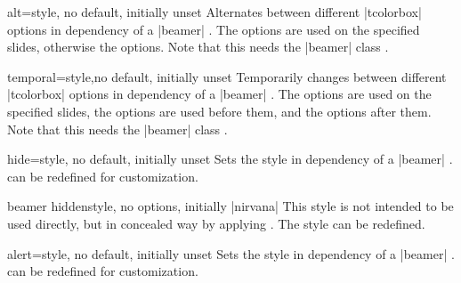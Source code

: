 \begin{docTcbKey}[][doc new={2025-05-28}]{alt}{=}{style, no default, initially unset}
Alternates between different |tcolorbox| options in dependency of a |beamer| .
The  options are used on the specified slides, otherwise the  options.
Note that this needs the |beamer| class \cite{tantau:beamer}.
\end{docTcbKey}

\begin{docTcbKey}[][doc new={2025-05-28}]{temporal}{=}{style,\linebreak no default, initially unset}
Temporarily changes between different |tcolorbox| options in dependency of a |beamer| .
The  options are used on the specified slides,
the  options are used before them, and
the  options after them.
Note that this needs the |beamer| class \cite{tantau:beamer}.
\end{docTcbKey}

\clearpage

\begin{docTcbKey}[][doc new={2019-03-01}]{hide}{=}{style, no default, initially unset}
Sets the  style in dependency of
a |beamer| .
 can be redefined for customization.
\end{docTcbKey}

\begin{docTcbKey}[][doc new={2019-03-01}]{beamer hidden}{}{style, no options, initially |nirvana|}
This style is not intended to be used directly, but in concealed way by applying
. The style can be redefined.
\begin{dispListing}
\end{dispListing}
\end{docTcbKey}

\begin{docTcbKey}[][doc new={2019-03-01}]{alert}{=}{style, no default, initially unset}
Sets the  style in dependency of
a |beamer| .
 can be redefined for customization.
\end{docTcbKey}


